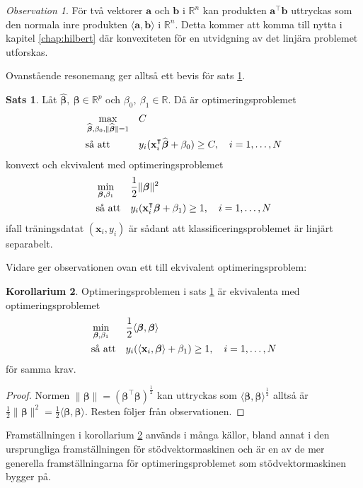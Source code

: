 \documentclass[a4paper, 12pt]{report}
\theoremstyle{definition}
\newtheorem{thm}{Sats}[section]
\newtheorem{cor}[thm]{Korollarium}
\theoremstyle{remark}
\newtheorem*{rem}{Observation}
\newcommand{\bfbeta}{{\boldsymbol{\beta}}}
\begin{document}
\begin{rem}
	För två vektorer $\mathbf{a}$ och $\mathbf{b}$ i $\mathbb{R}^n$ kan produkten $\mathbf{a}^\intercal\mathbf{b}$ uttryckas som den normala inre produkten $\langle \mathbf{a}, \mathbf{b} \rangle$ i $\mathbb{R}^n$. Detta kommer att komma till nytta i kapitel \ref{chap:hilbert} där konvexiteten för en utvidgning av det linjära problemet utforskas.
\end{rem}

Ovanstående resonemang ger alltså ett bevis för sats \ref{thm:primallinearproblem}.
\begin{thm}\label{thm:primallinearproblem}
	Låt $\widehat{\bfbeta},~\bfbeta \in \mathbb{R}^p$ och $\beta_0,~\beta_1 \in \mathbb{R}$. Då är optimeringsproblemet
	\begin{equation*}
	\begin{aligned}
	& \operatornamewithlimits{max}_{\widehat{\bfbeta},\beta_0,\|\widehat{\bfbeta}\|=1} & & C\\
	& \text{så att} & & y_i(\mathbf{x}_i^\intercal\widehat{\bfbeta}+\beta_0)\geq C,\quad i=1,\dots,N
	\end{aligned}
	\end{equation*}
	konvext och ekvivalent med optimeringsproblemet %
	\begin{equation*}
	\begin{aligned}
	& \operatornamewithlimits{min}_{\bfbeta,\beta_1} & & \frac{1}{2}\|\bfbeta\|^2\\
	& \text{så att} & & y_i(\mathbf{x}_i^\intercal\bfbeta+\beta_1)\geq 1,\quad i=1,\dots,N
	\end{aligned}
	\end{equation*}
	ifall träningsdatat $(\mathbf{x}_i,y_i)$ är sådant att klassificeringsproblemet är linjärt separabelt.
\end{thm}
Vidare ger observationen ovan ett till ekvivalent optimeringsproblem:
\begin{cor}\label{cor:inreproduktoptimering}
	Optimeringsproblemen i sats \ref{thm:primallinearproblem} är ekvivalenta med optimeringsproblemet
	\begin{equation*}
	\begin{aligned}
	& \operatornamewithlimits{min}_{\bfbeta,\beta_1} & & \frac{1}{2}\langle \bfbeta, \bfbeta \rangle\\
	& \text{så att} & & y_i(\langle \mathbf{x}_i,\bfbeta\rangle+\beta_1)\geq 1,\quad i=1,\dots,N
	\end{aligned}
	\end{equation*}
	för samma krav.
\end{cor}
\begin{proof}
	Normen $\|\bfbeta\|=(\bfbeta^\intercal\bfbeta)^{\frac{1}{2}}$ kan uttryckas som $\langle \bfbeta, \bfbeta \rangle^{\frac{1}{2}}$ alltså är $\frac{1}{2} \|\bfbeta\|^2=\frac{1}{2}\langle \bfbeta, \bfbeta \rangle$. Resten följer från observationen.
\end{proof}
Framställningen i korollarium \ref{cor:inreproduktoptimering} används i många källor, bland annat i den ursprungliga framställningen för stödvektormaskinen %
och är en av de mer generella framställningarna för optimeringsproblemet som stödvektormaskinen bygger på. %
\end{document}
